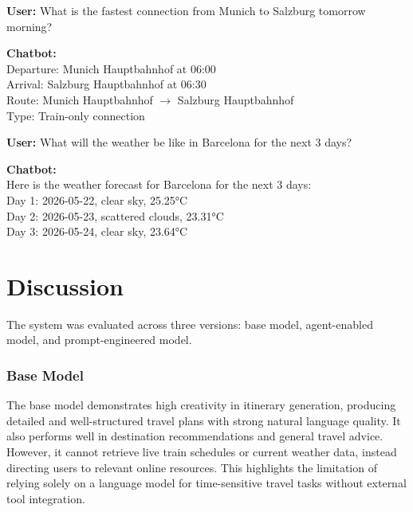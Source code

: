 \documentclass[fleqn,moreauthors,10pt]{ds_report}
\begin{document}
\begin{tcolorbox}[
    colback=gray!5,
    colframe=black!80,
    title=Prompt-Engineered Model Output - Train Schedule,
    arc=2mm
]

\textbf{User:} What is the fastest connection from Munich to Salzburg tomorrow morning?

\vspace{0.3cm}

\textbf{Chatbot:} \\
Departure: Munich Hauptbahnhof at 06:00\\
Arrival: Salzburg Hauptbahnhof at 06:30\\
Route: Munich Hauptbahnhof $\rightarrow$ Salzburg Hauptbahnhof\\
Type: Train-only connection
\end{tcolorbox}

\begin{tcolorbox}[
    colback=gray!5,
    colframe=black!80,
    title=Prompt-Engineered Model Output - Weather,
    arc=2mm
]

\textbf{User:} What will the weather be like in Barcelona for the next 3 days?

\vspace{0.3cm}

\textbf{Chatbot:} \\
Here is the weather forecast for Barcelona for the next 3 days:\\
Day 1: 2026-05-22, clear sky, 25.25°C\\
Day 2: 2026-05-23, scattered clouds, 23.31°C\\
Day 3: 2026-05-24, clear sky, 23.64°C

\end{tcolorbox}

\section*{Discussion}
The system was evaluated across three versions: base model, agent-enabled model, and prompt-engineered model.

\subsubsection*{Base Model}
The base model demonstrates high creativity in itinerary generation, 
producing detailed and well-structured travel plans with strong natural 
language quality. It also performs well in destination recommendations 
and general travel advice. However, it cannot retrieve live train 
schedules or current weather data, instead directing users to relevant 
online resources. This highlights the limitation of relying solely on a 
language model for time-sensitive travel tasks without external tool 
integration.
\end{document}
